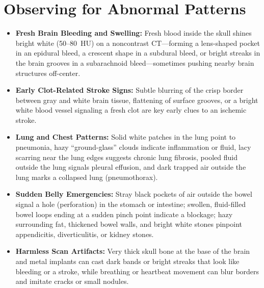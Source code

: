 \section{Observing for Abnormal Patterns}
\begin{itemize}
    \item \textbf{Fresh Brain Bleeding and Swelling:} Fresh blood inside the skull shines bright white (50--80~HU) on a noncontrast CT---forming a lens-shaped pocket in an epidural bleed, a crescent shape in a subdural bleed, or bright streaks in the brain grooves in a subarachnoid bleed---sometimes pushing nearby brain structures off-center.
    \item \textbf{Early Clot-Related Stroke Signs:} Subtle blurring of the crisp border between gray and white brain tissue, flattening of surface grooves, or a bright white blood vessel signaling a fresh clot are key early clues to an ischemic stroke.
    \item \textbf{Lung and Chest Patterns:} Solid white patches in the lung point to pneumonia, hazy ``ground-glass'' clouds indicate inflammation or fluid, lacy scarring near the lung edges suggests chronic lung fibrosis, pooled fluid outside the lung signals pleural effusion, and dark trapped air outside the lung marks a collapsed lung (pneumothorax).
    \item \textbf{Sudden Belly Emergencies:} Stray black pockets of air outside the bowel signal a hole (perforation) in the stomach or intestine; swollen, fluid-filled bowel loops ending at a sudden pinch point indicate a blockage; hazy surrounding fat, thickened bowel walls, and bright white stones pinpoint appendicitis, diverticulitis, or kidney stones.
    \item \textbf{Harmless Scan Artifacts:} Very thick skull bone at the base of the brain and metal implants can cast dark bands or bright streaks that look like bleeding or a stroke, while breathing or heartbeat movement can blur borders and imitate cracks or small nodules.
\end{itemize}

